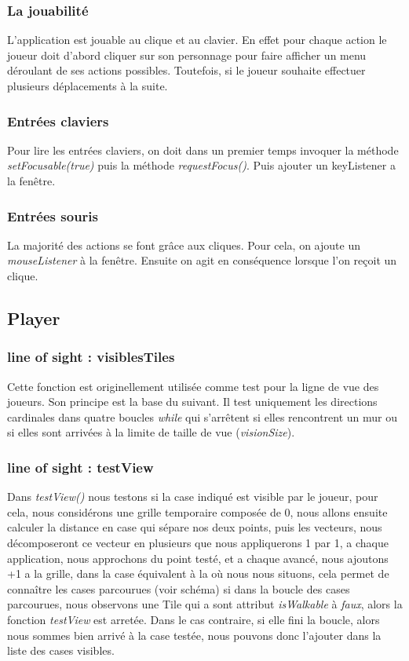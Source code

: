 \documentclass[a4paper,12pt]{article} %
\begin{document}
\subsubsection{La jouabilité}
L'application est jouable au clique et au clavier. En effet pour chaque action le joueur doit d'abord cliquer sur son personnage pour faire afficher un menu déroulant de ses actions possibles. Toutefois, si le joueur souhaite effectuer plusieurs déplacements à la suite.
\subsubsection{Entrées claviers}
Pour lire les entrées claviers, on doit dans un premier temps invoquer la méthode \textit{setFocusable(true)} puis la méthode \textit{requestFocus()}. Puis ajouter un keyListener a la fenêtre. 
\subsubsection{Entrées souris}
La majorité des actions se font grâce aux cliques. Pour cela, on ajoute un \textit{mouseListener} à la fenêtre. Ensuite on agit en conséquence lorsque l'on reçoit un clique.
\subsection{Player}
\subsubsection{line of sight : visiblesTiles}
Cette fonction est originellement utilisée comme test pour la ligne de vue des joueurs. Son principe est la base du suivant. Il test uniquement les directions cardinales dans quatre boucles \textit{while} qui s'arrêtent si elles rencontrent un mur ou si elles sont arrivées à la limite de taille de vue (\textit{visionSize}).
\subsubsection{line of sight : testView}
Dans \textit{testView()} nous testons si la case indiqué est visible par le joueur, pour cela, nous considérons une grille temporaire composée de 0, nous allons ensuite calculer la distance en case qui sépare nos deux points, puis les vecteurs, nous décomposeront ce vecteur en plusieurs que nous appliquerons 1 par 1, a chaque application, nous approchons du point testé, et a  chaque avancé, nous ajoutons +1 a la grille, dans la case équivalent à la où nous nous situons, cela permet de connaître les cases parcourues (voir schéma) si dans la boucle des cases parcourues, nous observons une Tile qui a sont attribut \textit{isWalkable} à \textit{faux}, alors la fonction \textit{testView} est arretée. Dans le cas contraire, si elle fini la boucle, alors nous sommes bien arrivé à la case testée, nous pouvons donc l'ajouter dans la liste des cases visibles.
\end{document}

